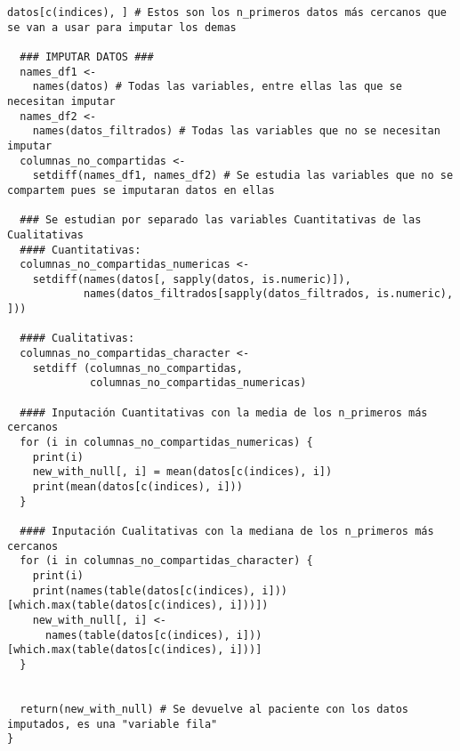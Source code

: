 \begin{lstlisting}[style=mystyle,caption={Input\_Gower.R}, label={lst:input-gower-fun}]
  datos[c(indices), ] # Estos son los n_primeros datos más cercanos que se van a usar para imputar los demas
  
  ### IMPUTAR DATOS ###
  names_df1 <-
    names(datos) # Todas las variables, entre ellas las que se necesitan imputar
  names_df2 <-
    names(datos_filtrados) # Todas las variables que no se necesitan imputar
  columnas_no_compartidas <-
    setdiff(names_df1, names_df2) # Se estudia las variables que no se compartem pues se imputaran datos en ellas
  
  ### Se estudian por separado las variables Cuantitativas de las Cualitativas
  #### Cuantitativas:
  columnas_no_compartidas_numericas <-
    setdiff(names(datos[, sapply(datos, is.numeric)]),
            names(datos_filtrados[sapply(datos_filtrados, is.numeric), ]))
  
  #### Cualitativas:
  columnas_no_compartidas_character <-
    setdiff (columnas_no_compartidas,
             columnas_no_compartidas_numericas)
  
  #### Inputación Cuantitativas con la media de los n_primeros más cercanos
  for (i in columnas_no_compartidas_numericas) {
    print(i)
    new_with_null[, i] = mean(datos[c(indices), i])
    print(mean(datos[c(indices), i]))
  }
  
  #### Inputación Cualitativas con la mediana de los n_primeros más cercanos
  for (i in columnas_no_compartidas_character) {
    print(i)
    print(names(table(datos[c(indices), i]))[which.max(table(datos[c(indices), i]))])
    new_with_null[, i] <-
      names(table(datos[c(indices), i]))[which.max(table(datos[c(indices), i]))]
  }
  
  
  return(new_with_null) # Se devuelve al paciente con los datos imputados, es una "variable fila"
}
\end{lstlisting}

\vspace{-5pt}
